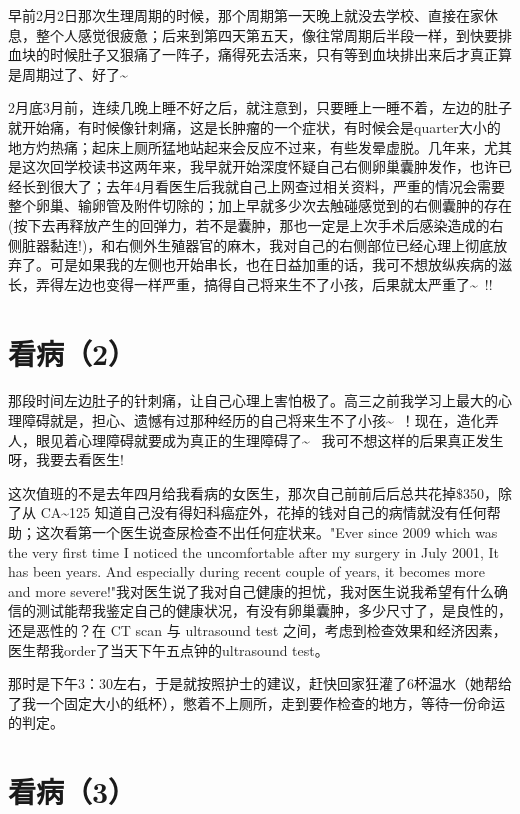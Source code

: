 \documentclass[12pt]{book}
\begin{document}
早前2月2日那次生理周期的时候，那个周期第一天晚上就没去学校、直接在家休息，整个人感觉很疲惫；后来到第四天第五天，像往常周期后半段一样，到快要排血块的时候肚子又狠痛了一阵子，痛得死去活来，只有等到血块排出来后才真正算是周期过了、好了\textasciitilde{}~

2月底3月前，连续几晚上睡不好之后，就注意到，只要睡上一睡不着，左边的肚子就开始痛，有时候像针刺痛，这是长肿瘤的一个症状，有时候会是quarter大小的地方灼热痛；起床上厕所猛地站起来会反应不过来，有些发晕虚脱。几年来，尤其是这次回学校读书这两年来，我早就开始深度怀疑自己右侧卵巢囊肿发作，也许已经长到很大了；去年4月看医生后我就自己上网查过相关资料，严重的情况会需要整个卵巢、输卵管及附件切除的；加上早就多少次去触碰感觉到的右侧囊肿的存在(按下去再释放产生的回弹力，若不是囊肿，那也一定是上次手术后感染造成的右侧脏器黏连!)，和右侧外生殖器官的麻木，我对自己的右侧部位已经心理上彻底放弃了。可是如果我的左侧也开始串长，也在日益加重的话，我可不想放纵疾病的滋长，弄得左边也变得一样严重，搞得自己将来生不了小孩，后果就太严重了\textasciitilde{}~!! 

\section{看病（2）}
\label{sec-30-2}

那段时间左边肚子的针刺痛，让自己心理上害怕极了。高三之前我学习上最大的心理障碍就是，担心、遗憾有过那种经历的自己将来生不了小孩\textasciitilde{}~！现在，造化弄人，眼见着心理障碍就要成为真正的生理障碍了\textasciitilde{}~ 我可不想这样的后果真正发生呀，我要去看医生!

这次值班的不是去年四月给我看病的女医生，那次自己前前后后总共花掉\$350，除了从 CA\textasciitilde{}125 知道自己没有得妇科癌症外，花掉的钱对自己的病情就没有任何帮助；这次看第一个医生说查尿检查不出任何症状来。"Ever since 2009 which was the very first time I noticed the uncomfortable after my surgery in July 2001, It has been years.  And especially during recent couple of years, it becomes more and more severe!"我对医生说了我对自己健康的担忧，我对医生说我希望有什么确信的测试能帮我鉴定自己的健康状况，有没有卵巢囊肿，多少尺寸了，是良性的，还是恶性的？在 CT scan 与 ultrasound test 之间，考虑到检查效果和经济因素，医生帮我order了当天下午五点钟的ultrasound test。

那时是下午3：30左右，于是就按照护士的建议，赶快回家狂灌了6杯温水（她帮给了我一个固定大小的纸杯），憋着不上厕所，走到要作检查的地方，等待一份命运的判定。

\section{看病（3）}
\label{sec-30-3}
\end{document}
